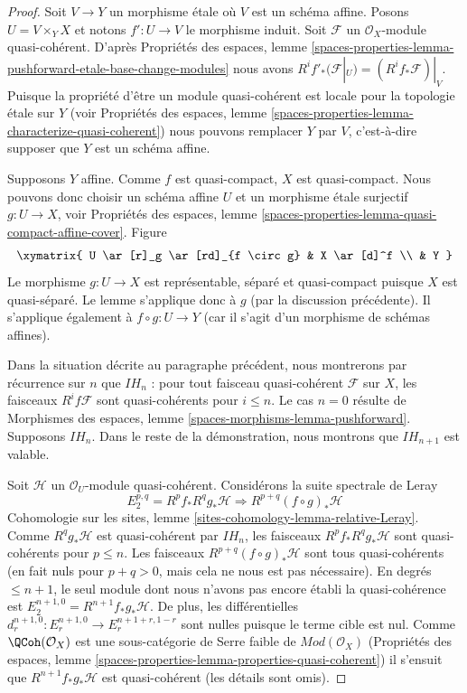 \begin{proof}
Soit $V \to Y$ un morphisme étale où $V$ est un schéma affine. Posons
$U = V \times_Y X$ et notons $f' : U \to V$ le morphisme induit.
Soit $\mathcal{F}$ un $\mathcal{O}_X$-module quasi-cohérent. D'après
Propriétés des espaces, lemme
\ref{spaces-properties-lemma-pushforward-etale-base-change-modules}
nous avons
$R^if'_*(\mathcal{F}|_U) = (R^if_*\mathcal{F})|_V$.
Puisque la propriété d'être un module quasi-cohérent est locale pour la
topologie étale sur $Y$ (voir
Propriétés des espaces, lemme
\ref{spaces-properties-lemma-characterize-quasi-coherent})
nous pouvons remplacer $Y$ par $V$, c'est-à-dire supposer que $Y$ est un schéma affine.

\medskip\noindent
Supposons $Y$ affine. Comme $f$ est quasi-compact, $X$ est
quasi-compact. Nous pouvons donc choisir un schéma affine $U$ et un
morphisme étale surjectif $g : U \to X$, voir
Propriétés des espaces,
lemme \ref{spaces-properties-lemma-quasi-compact-affine-cover}.
Figure
$$
\xymatrix{
U \ar[r]_g \ar[rd]_{f \circ g} & X \ar[d]^f \\
& Y
}
$$
Le morphisme $g : U \to X$ est représentable, séparé
et quasi-compact puisque $X$ est quasi-séparé. Le lemme
s'applique donc à $g$ (par la discussion précédente).
Il s'applique également à $f \circ g : U \to Y$ (car il s'agit d'un morphisme
de schémas affines).

\medskip\noindent
Dans la situation décrite au paragraphe précédent, nous montrerons par
récurrence sur $n$ que $IH_n$ : pour tout faisceau quasi-cohérent $\mathcal{F}$
sur $X$, les faisceaux $R^if\mathcal{F}$
sont quasi-cohérents pour $i \leq n$.
Le cas $n = 0$ résulte de
Morphismes des espaces, lemme \ref{spaces-morphisms-lemma-pushforward}.
Supposons $IH_n$. Dans le reste de la démonstration, nous montrons que $IH_{n + 1}$ est valable.

\medskip\noindent
Soit $\mathcal{H}$ un $\mathcal{O}_U$-module quasi-cohérent.
Considérons la suite spectrale de Leray
$$
E_2^{p, q} = R^pf_* R^qg_* \mathcal{H}
\Rightarrow
R^{p + q}(f \circ g)_*\mathcal{H}
$$
Cohomologie sur les sites, lemme \ref{sites-cohomology-lemma-relative-Leray}.
Comme $R^qg_*\mathcal{H}$ est quasi-cohérent par $IH_n$, les faisceaux
$R^pf_*R^qg_*\mathcal{H}$ sont quasi-cohérents pour $p \leq n$.
Les faisceaux $R^{p + q}(f \circ g)_*\mathcal{H}$ sont tous
quasi-cohérents (en fait nuls pour $p + q > 0$, mais cela ne nous est pas nécessaire).
En degrés $\leq n + 1$, le seul module dont nous n'avons pas encore
établi la quasi-cohérence est $E_2^{n + 1, 0} = R^{n + 1}f_*g_*\mathcal{H}$.
De plus, les différentielles
$d_r^{n + 1, 0} : E_r^{n + 1, 0} \to E_r^{n + 1 + r, 1 - r}$
sont nulles puisque le terme cible est nul. Comme $\QCoh(\mathcal{O}_X)$
est une sous-catégorie de Serre faible de $\textit{Mod}(\mathcal{O}_X)$
(Propriétés des espaces, lemme
\ref{spaces-properties-lemma-properties-quasi-coherent})
il s'ensuit que $R^{n + 1}f_*g_*\mathcal{H}$
est quasi-cohérent (les détails sont omis).


\end{proof}
